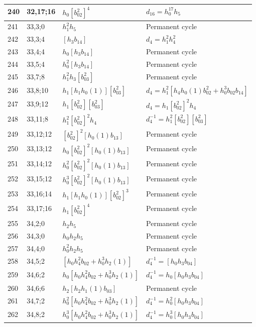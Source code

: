 \documentclass{article}
\begin{document}
\begin{longtable}{|l|l|>{\raggedright\arraybackslash}p{6cm}|>{\raggedright\arraybackslash}p{6cm}|}
\hline
240 & 32,17;16 & $h_0[b_{02}^2]^4$ &$d_{16}=h_0^{17}h_5$\\
\hline
241 & 33,3;0 & $h_1^2h_5$ & Permanent cycle\\
\hline
242 & 33,3;4 & $[h_3b_{14}]$ &$d_{4}=h_1^2h_4^2$\\
\hline
243 & 33,4;4 & $h_0[h_3b_{14}]$ & Permanent cycle\\
\hline
244 & 33,5;4 & $h_0^2[h_3b_{14}]$ & Permanent cycle\\
\hline
245 & 33,7;8 & $h_1^2h_3[b_{03}^2]$ & Permanent cycle\\
\hline
246 & 33,8;10 & $h_1[h_1h_0(1)][b_{03}^2]$ &$d_{4}=h_1^2[h_4h_0(1)b_{02}^2 + h_0^3b_{02}b_{14}]$\\
\hline
247 & 33,9;12 & $h_1[b_{02}^2][b_{03}^2]$ &$d_{4}=h_1[b_{02}^2]^2h_4$\\
\hline
248 & 33,11;8 & $h_1^2[b_{02}^2]^2h_4$ & $d_{4}^{-1}=h_1^2[b_{02}^2][b_{03}^2]$\\
\hline
249 & 33,12;12 & $[b_{02}^2]^2[h_0(1)b_{13}]$ & Permanent cycle\\
\hline
250 & 33,13;12 & $h_0[b_{02}^2]^2[h_0(1)b_{13}]$ & Permanent cycle\\
\hline
251 & 33,14;12 & $h_0^2[b_{02}^2]^2[h_0(1)b_{13}]$ & Permanent cycle\\
\hline
252 & 33,15;12 & $h_0^3[b_{02}^2]^2[h_0(1)b_{13}]$ & Permanent cycle\\
\hline
253 & 33,16;14 & $h_1[h_1h_0(1)][b_{02}^2]^3$ & Permanent cycle\\
\hline
254 & 33,17;16 & $h_1[b_{02}^2]^4$ & Permanent cycle\\
\hline
255 & 34,2;0 & $h_2h_5$ & Permanent cycle\\
\hline
256 & 34,3;0 & $h_0h_2h_5$ & Permanent cycle\\
\hline
257 & 34,4;0 & $h_0^2h_2h_5$ & Permanent cycle\\
\hline
258 & 34,5;2 & $[h_0h_4^2b_{02} + h_0^3h_2(1)]$ & $d_{4}^{-1}=[h_0h_3b_{04}]$\\
\hline
259 & 34,6;2 & $h_0[h_0h_4^2b_{02} + h_0^3h_2(1)]$ & $d_{4}^{-1}=h_0[h_0h_3b_{04}]$\\
\hline
260 & 34,6;6 & $h_2[h_2h_1(1)b_{03}]$ & Permanent cycle\\
\hline
261 & 34,7;2 & $h_0^2[h_0h_4^2b_{02} + h_0^3h_2(1)]$ & $d_{4}^{-1}=h_0^2[h_0h_3b_{04}]$\\
\hline
262 & 34,8;2 & $h_0^3[h_0h_4^2b_{02} + h_0^3h_2(1)]$ & $d_{4}^{-1}=h_0^3[h_0h_3b_{04}]$\\
\hline

\end{longtable}
\end{document}
